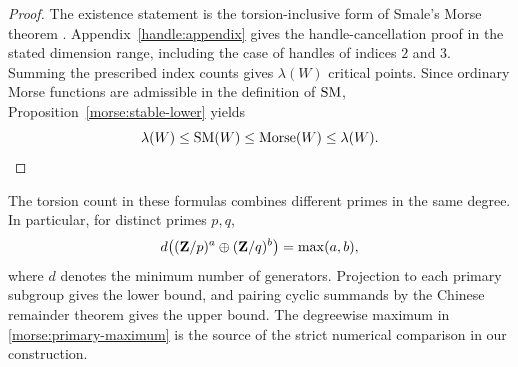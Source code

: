 \begin{proof}
The existence statement is the torsion-inclusive form of Smale's
Morse theorem \cite[Theorem~2.4 and the following paragraph,
pp.~134--135]{Smale1963}.  Appendix~\ref{handle:appendix} gives the
handle-cancellation proof in the stated dimension range, including the
case of handles of indices $2$ and $3$.
Summing the prescribed index counts gives $\lambda(W)$ critical points.
Since ordinary Morse functions are admissible in the definition of
$\operatorname{SM}$, Proposition~\ref{morse:stable-lower} yields
\[
 \lambda(W)\leq\operatorname{SM}(W)\leq\operatorname{Morse}(W)\leq\lambda(W).
\]
\end{proof}

The torsion count in these formulas combines different primes in the
same degree.  In particular, for distinct primes $p,q$,
\begin{equation}\label{morse:primary-maximum}
 d\bigl((\mathbf Z/p)^a\oplus(\mathbf Z/q)^b\bigr)=\max(a,b),
\end{equation}
where $d$ denotes the minimum number of generators.
Projection to each primary subgroup gives the lower bound, and pairing
cyclic summands by the Chinese remainder theorem gives the upper bound.
The degreewise maximum in \eqref{morse:primary-maximum} is the source of
the strict numerical comparison in our construction.

